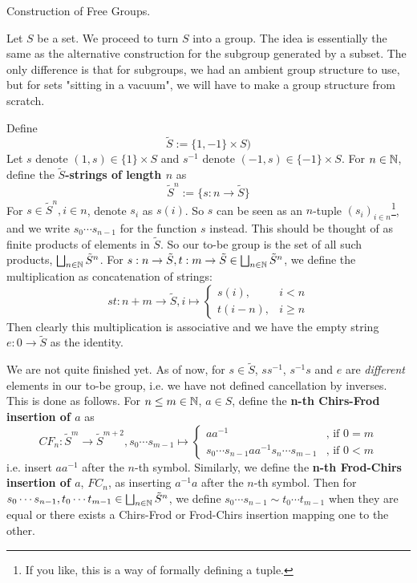 \documentclass[../../book.tex]{subfiles}
\begin{document}
\begin{ex} \dolater Construction of Free Groups. 

    Let $S$ be a set. We proceed to turn $S$ into a group.
    The idea is essentially the same as the alternative 
    construction for the subgroup generated by a subset.
    The only difference is that for subgroups, 
    we had an ambient group structure to use,
    but for sets "sitting in a vacuum", 
    we will have to make a group structure from scratch.
    
    Define 
    \[\tilde{S} := \{1,-1\}\times S)\]
    Let $s$ denote $(1,s) \in \{1\} \times S$ and
    $s^{-1}$ denote $(-1,s) \in \{-1\} \times S$. 
    For $n \in \mathbb{N}$, define the \textbf{$\tilde{S}$-strings of length $n$} as
    \[
        \tilde{S}^n := \{ s : n \to \tilde{S} \}
    \]
    For $s \in \tilde{S}^n, i \in n$, denote $s_i$ as $s(i)$.
    So $s$ can be seen as an $n$-tuple $(s_i)_{i \in n}$\footnote{If you like,
    this is a way of formally
    defining a tuple.},
    and we write $s_0\cdots s_{n-1}$ for the function $s$ instead.
    This should be thought of as finite products of elements in $\tilde{S}$.
    So our to-be group is the set of all such products, 
    $\bigsqcup_{n \in \mathbb{N}} \tilde{S}^n$.
    For 
    $s : n \to \tilde{S}, t : m \to \tilde{S} \in \bigsqcup_{n \in \mathbb{N}} \tilde{S}^n$,
    we define the multiplication as concatenation of strings: 
    \[
        st : n+m \to \tilde{S}, i \mapsto 
        \begin{cases}
            s(i), & i < n \\
            t(i-n), & i \geq n
        \end{cases}
    \]
    Then clearly this multiplication is associative and 
    we have the empty string $e : 0 \to \tilde{S}$ as the identity. 
    
    We are not quite finished yet.
    As of now, for $s \in \tilde{S}$, 
    $ss^{-1}$, $s^{-1}s$ and $e$ are \emph{different} elements in our to-be group,
    i.e. we have not defined cancellation by inverses. 
    This is done as follows. 
    For $n \leq m \in \mathbb{N}$, $a \in S$,  
    define the \textbf{n-th Chirs-Frod insertion of $a$}
    as 
    \[
        CF_n : \tilde{S}^m \to \tilde{S}^{m+2}, 
        s_0\cdots s_{m-1} \mapsto 
        \begin{cases}
        aa^{-1} & \text{, if } 0 = m\\
        s_0 \cdots s_{n-1} a a^{-1} s_n \cdots s_{m-1} & \text{, if } 0 < m
        \end{cases}
    \]
    i.e. insert $aa^{-1}$ after the $n$-th symbol. 
    Similarly, we define the \textbf{n-th Frod-Chirs insertion of $a$}, $FC_n$, 
    as inserting $a^{-1}a$ after the $n$-th symbol. 
    Then for 
    $s_0\cdots s_{n-1}, t_0\cdots t_{m-1} \in \bigsqcup_{n \in \mathbb{N}} \tilde{S}^n$, 
    we define $s_0\cdots s_{n-1} \sim t_0\cdots t_{m-1}$ when
    they are equal or there exists a Chirs-Frod or Frod-Chirs insertion
    mapping one to the other. 
    

\end{ex}
\end{document}

